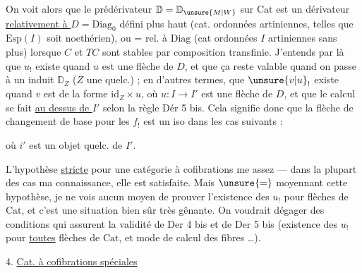 On voit alors que le prédérivateur
$\mathbb{D}=\mathbb{D}_{\unsure{M|W}}$  sur $\mathrm{Cat}$ est  un dérivateur
\uline{relativement à $D=\mathrm{Diag}_0$} défini plus haut
(cat. ordonnées  artiniennes, telles que $\mathrm{Esp}(I)$
soit noethérien), ou $\mathord{=}$ rel. à $\mathrm{Diag}$ (cat
ordonnées $I$ artiniennes sans plus)
lorsque $C$ et $TC$ sont stables par composition
transfinie. J'entends par là que
$u_!$ existe quand $u$ est une flèche de $D$,
et que ça reste valable quand on passe
à un  induit $\mathbb{D}_Z$ ($Z$ une 
quelc.) ; en d'autres termes, que $\unsure{v|u}_!$ existe
quand $v$ est de la forme $\mathrm{id}_Z\times u$, où $u:I\to I'$
est une flèche de $D$, et que le
calcul se fait \uline{au dessus de $I'$} selon
la règle Dér 5 bis. Cela signifie donc que
la flèche de changement de base pour les
$f_!$ est un iso dans les cas suivants :


où $i'$ est un objet quelc. de $I'$.

L'hypothèse \uline{stricte} pour une catégorie à
cofibrations me  assez  --- dans
la plupart des cas  ma connaissance, elle
est satisfaite. Mais  $\unsure{=}$
moyennant cette hypothèse, je ne vois
aucun moyen de prouver l'existence
des $u_!$ pour \uline{} flèches de $\mathrm{Cat}$, et c'est
une situation bien sûr très gênante.
On voudrait  dégager des
conditions qui assurent la validité de Der 4 bis
et de Der 5 bis (existence des $u_!$ pour
\uline{toutes} flèches de $\mathrm{Cat}$, et mode de calcul des
fibres \ldots).

4. \uline{Cat. à cofibrations spéciales}


